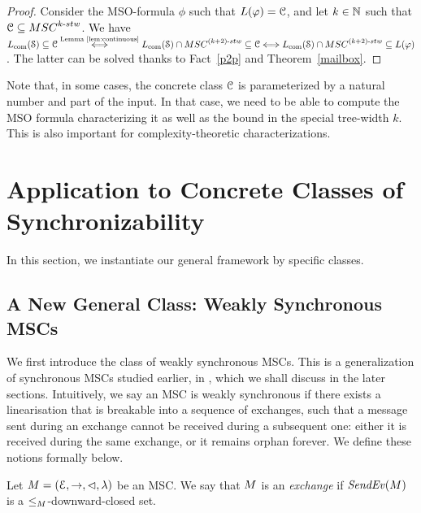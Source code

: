 \documentclass[a4paper,UKenglish,cleveref, autoref, thm-restate]{lipics-v2021}
\begin{document}
\begin{proof}
Consider the MSO-formula $\phi$ such that $L(\varphi) = \mathcal{C}$, and
let $k \in \mathbb{N}$ such that $\Class \subseteq \stwMSCs{k}$.
We have
$\cL{\System} \subseteq \Class
 \stackrel{\textup{Lemma~\ref{lem:continuous}}}{\Longleftrightarrow} \cL{\System} \cap \stwMSCs{(k+2)} \subseteq \Class
 \Longleftrightarrow \cL{\System} \cap \stwMSCs{(k+2)} \subseteq L(\phi)$.
The latter can be solved thanks to Fact~\ref{p2p} and Theorem~\ref{mailbox}.
\end{proof}

\begin{remark}
Note that, in some cases, the concrete class $\mathcal{C}$ is parameterized by a natural number and
part of the input. In that case, we need to be able to compute the
MSO formula characterizing it as well as the bound in the special tree-width $k$.
This is also important for complexity-theoretic characterizations.
\end{remark}





\section{Application to Concrete Classes of Synchronizability}

In this section, we instantiate our general framework by specific classes.


\subsection{A New General Class: Weakly Synchronous MSCs} \label{sec:weakly-sync}

We first introduce the class of weakly synchronous MSCs. This is a generalization of synchronous MSCs studied earlier, in \cite{DBLP:conf/cav/BouajjaniEJQ18, DBLP:conf/fossacs/GiustoLL20}, which we shall discuss in the later sections. Intuitively, we say an MSC is weakly synchronous if there exists a linearisation that is breakable into a sequence of exchanges, such that a message sent during an exchange cannot be received during a subsequent one: either it is received during the same exchange, or it remains orphan forever. We define these notions formally below.

\begin{definition}[exchange]\label{def:weak-synchr}
Let $M = (\mathcal{E},\to,\lhd,\lambda)$ be an MSC.
We say that $M$ is an \emph{exchange} if
$\mathit{SendEv}(M)$ is
a ${\le_M}$-downward-closed set.
\end{definition}
\end{document}
